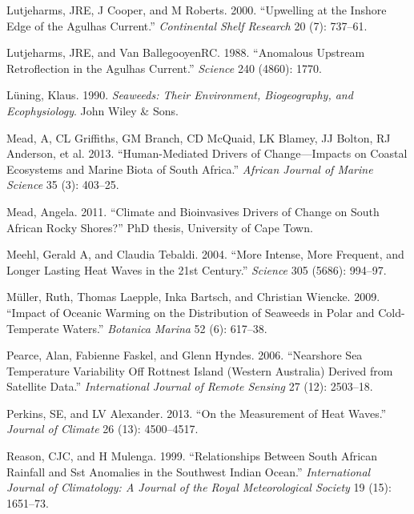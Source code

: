 \documentclass[12pt,a4paper,]{article}
\begin{document}
\leavevmode\hypertarget{ref-Lutjeharms2000}{}%
Lutjeharms, JRE, J Cooper, and M Roberts. 2000. ``Upwelling at the
Inshore Edge of the Agulhas Current.'' \emph{Continental Shelf Research}
20 (7): 737--61.

\leavevmode\hypertarget{ref-Lutjeharms1988}{}%
Lutjeharms, JRE, and Van BallegooyenRC. 1988. ``Anomalous Upstream
Retroflection in the Agulhas Current.'' \emph{Science} 240 (4860): 1770.

\leavevmode\hypertarget{ref-Luning1990}{}%
Lüning, Klaus. 1990. \emph{Seaweeds: Their Environment, Biogeography,
and Ecophysiology}. John Wiley \& Sons.

\leavevmode\hypertarget{ref-Mead2013}{}%
Mead, A, CL Griffiths, GM Branch, CD McQuaid, LK Blamey, JJ Bolton, RJ
Anderson, et al. 2013. ``Human-Mediated Drivers of Change---Impacts on
Coastal Ecosystems and Marine Biota of South Africa.'' \emph{African
Journal of Marine Science} 35 (3): 403--25.

\leavevmode\hypertarget{ref-Mead2011}{}%
Mead, Angela. 2011. ``Climate and Bioinvasives Drivers of Change on
South African Rocky Shores?'' PhD thesis, University of Cape Town.

\leavevmode\hypertarget{ref-Meehl2004}{}%
Meehl, Gerald A, and Claudia Tebaldi. 2004. ``More Intense, More
Frequent, and Longer Lasting Heat Waves in the 21st Century.''
\emph{Science} 305 (5686): 994--97.

\leavevmode\hypertarget{ref-Muller2009}{}%
Müller, Ruth, Thomas Laepple, Inka Bartsch, and Christian Wiencke. 2009.
``Impact of Oceanic Warming on the Distribution of Seaweeds in Polar and
Cold-Temperate Waters.'' \emph{Botanica Marina} 52 (6): 617--38.

\leavevmode\hypertarget{ref-Pearce2006}{}%
Pearce, Alan, Fabienne Faskel, and Glenn Hyndes. 2006. ``Nearshore Sea
Temperature Variability Off Rottnest Island (Western Australia) Derived
from Satellite Data.'' \emph{International Journal of Remote Sensing} 27
(12): 2503--18.

\leavevmode\hypertarget{ref-Perkins2013}{}%
Perkins, SE, and LV Alexander. 2013. ``On the Measurement of Heat
Waves.'' \emph{Journal of Climate} 26 (13): 4500--4517.

\leavevmode\hypertarget{ref-Reason1999}{}%
Reason, CJC, and H Mulenga. 1999. ``Relationships Between South African
Rainfall and Sst Anomalies in the Southwest Indian Ocean.''
\emph{International Journal of Climatology: A Journal of the Royal
Meteorological Society} 19 (15): 1651--73.
\end{document}
